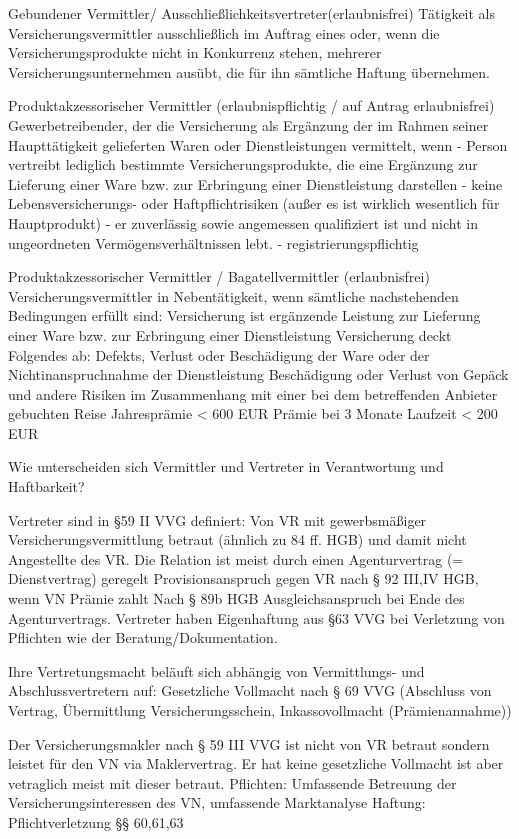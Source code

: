 Gebundener Vermittler/ Ausschließlichkeitsvertreter(erlaubnisfrei)
Tätigkeit als Versicherungsvermittler ausschließlich im Auftrag eines oder, wenn die Versicherungsprodukte nicht in Konkurrenz stehen, 
mehrerer Versicherungsunternehmen ausübt, die für ihn sämtliche Haftung übernehmen.


Produktakzessorischer Vermittler (erlaubnispflichtig / auf Antrag erlaubnisfrei)
Gewerbetreibender, der die Versicherung als Ergänzung der im Rahmen seiner Haupttätigkeit gelieferten Waren oder Dienstleistungen vermittelt, 
wenn
- Person vertreibt lediglich bestimmte Versicherungsprodukte, die eine Ergänzung zur Lieferung einer Ware bzw. zur Erbringung einer Dienstleistung darstellen
- keine Lebensversicherungs- oder Haftpflichtrisiken (außer es ist wirklich wesentlich für Hauptprodukt)
- er zuverlässig sowie angemessen qualifiziert ist und nicht in ungeordneten Vermögensverhältnissen lebt.
- registrierungspflichtig

Produktakzessorischer Vermittler / Bagatellvermittler (erlaubnisfrei)
Versicherungsvermittler in Nebentätigkeit, wenn sämtliche nachstehenden Bedingungen erfüllt sind:
Versicherung ist ergänzende Leistung zur Lieferung einer Ware bzw. zur Erbringung einer Dienstleistung Versicherung deckt Folgendes ab:
Defekts, Verlust oder Beschädigung der Ware oder der Nichtinanspruchnahme der Dienstleistung
Beschädigung oder Verlust von Gepäck und andere Risiken im Zusammenhang mit einer bei dem betreffenden Anbieter gebuchten Reise
Jahresprämie < 600 EUR
Prämie bei 3 Monate Laufzeit < 200 EUR


Wie unterscheiden sich Vermittler und Vertreter in Verantwortung und Haftbarkeit? 

Vertreter sind in §59 II VVG definiert: Von VR mit gewerbsmäßiger Versicherungsvermittlung betraut
(ähnlich zu 84 ff. HGB) und damit nicht Angestellte des VR.
Die Relation ist meist durch einen Agenturvertrag (= Dienstvertrag) geregelt
Provisionsanspruch gegen VR nach § 92 III,IV HGB, wenn VN Prämie zahlt
Nach § 89b HGB Ausgleichsanspruch bei Ende des Agenturvertrags.
Vertreter haben Eigenhaftung aus §63 VVG bei Verletzung von Pflichten wie der Beratung/Dokumentation.

Ihre Vertretungsmacht beläuft sich abhängig von Vermittlungs- und Abschlussvertretern auf:
Gesetzliche Vollmacht nach § 69 VVG (Abschluss von Vertrag, Übermittlung Versicherungsschein, Inkassovollmacht (Prämienannahme))

Der Versicherungsmakler nach § 59 III VVG ist nicht von VR betraut sondern leistet für den VN
via Maklervertrag. Er hat keine gesetzliche Vollmacht ist aber vetraglich meist mit dieser betraut.
Pflichten: Umfassende Betreuung der Versicherungsinteressen des VN,
umfassende Marktanalyse
Haftung: Pflichtverletzung §§ 60,61,63

